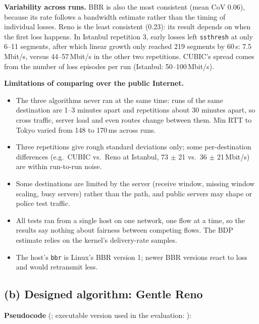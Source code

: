 \documentclass[10pt]{article}
\newcommand{\repo}{https://github.com/philwisniewski/cs-422-assignment-2}
\newcommand{\commit}{d1408ba303b1e3132ba5504e32ebf2ed3572d4e0}
\newcommand{\src}[4]{\href{\repo/blob/\commit/#1\#L#2-L#3}{\texttt{\detokenize{#4}}}}
\newcommand{\file}[1]{\href{\repo/blob/\commit/#1}{\texttt{\detokenize{#1}}}}
\begin{document}
\textbf{Variability across runs.} BBR is also the most consistent (mean CoV 0.06), because its rate follows a bandwidth estimate rather than the timing of individual losses. Reno is the least consistent (0.23): its result depends on when the first loss happens. In Istanbul repetition 3, early losses left \texttt{ssthresh} at only 6--11 segments, after which linear growth only reached 219 segments by 60\,s: 7.5\,Mbit/s, versus 44--57\,Mbit/s in the other two repetitions. CUBIC's spread comes from the number of loss episodes per run (Istanbul: 50--100\,Mbit/s).

\textbf{Limitations of comparing over the public Internet.}
\begin{itemize}
\item The three algorithms never ran at the same time: runs of the same destination are 1--3 minutes apart and repetitions about 30 minutes apart, so cross traffic, server load and even routes change between them. Min RTT to Tokyo varied from 148 to 170\,ms across runs.
\item Three repetitions give rough standard deviations only; some per-destination differences (e.g.\ CUBIC vs.\ Reno at Istanbul, 73 $\pm$ 21 vs.\ 36 $\pm$ 21\,Mbit/s) are within run-to-run noise.
\item Some destinations are limited by the server (receive window, missing window scaling, busy servers) rather than the path, and public servers may shape or police test traffic.
\item All tests ran from a single host on one network, one flow at a time, so the results say nothing about fairness between competing flows. The BDP estimate relies on the kernel's delivery-rate samples.
\item The host's \texttt{bbr} is Linux's BBR version 1; newer BBR versions react to loss and would retransmit less.
\end{itemize}

\clearpage
\subsection{(b) Designed algorithm: Gentle Reno}

\textbf{Pseudocode} (\file{custom_tcp.txt}; executable version used in the evaluation: \src{analysis.py}{664}{710}{GentleReno}):
\end{document}
